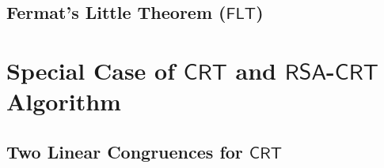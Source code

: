 \documentclass{article}
\newcommand{\rsa}{\mathsf{RSA}}
\newcommand{\inv}[1]{#1^{-1}}
\newtheorem*{theorem*}{Theorem}
\theoremstyle{definition}
\begin{document}
	
	\subsection{Fermat's Little Theorem ($\mathsf{FLT}$)}
	
	\newpage
	
	\section{Special Case of $\mathsf{CRT}$ and $\rsa$-$\mathsf{CRT}$ Algorithm}
	
	\subsection{Two Linear Congruences for $\mathsf{CRT}$}
	

\end{document}
